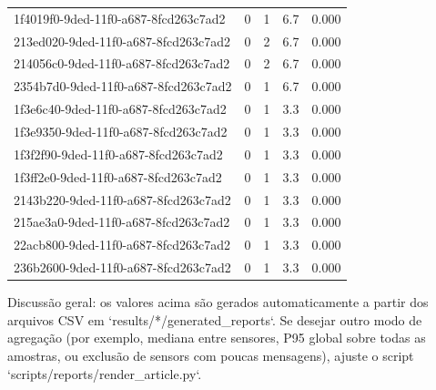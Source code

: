 \begin{longtable}{l r r r r}
1f4019f0-9ded-11f0-a687-8fcd263c7ad2 & 0 & 1 & 6.7 & 0.000 \\

213ed020-9ded-11f0-a687-8fcd263c7ad2 & 0 & 2 & 6.7 & 0.000 \\

214056c0-9ded-11f0-a687-8fcd263c7ad2 & 0 & 2 & 6.7 & 0.000 \\

2354b7d0-9ded-11f0-a687-8fcd263c7ad2 & 0 & 1 & 6.7 & 0.000 \\

1f3e6c40-9ded-11f0-a687-8fcd263c7ad2 & 0 & 1 & 3.3 & 0.000 \\

1f3e9350-9ded-11f0-a687-8fcd263c7ad2 & 0 & 1 & 3.3 & 0.000 \\

1f3f2f90-9ded-11f0-a687-8fcd263c7ad2 & 0 & 1 & 3.3 & 0.000 \\

1f3ff2e0-9ded-11f0-a687-8fcd263c7ad2 & 0 & 1 & 3.3 & 0.000 \\

2143b220-9ded-11f0-a687-8fcd263c7ad2 & 0 & 1 & 3.3 & 0.000 \\

215ae3a0-9ded-11f0-a687-8fcd263c7ad2 & 0 & 1 & 3.3 & 0.000 \\

22acb800-9ded-11f0-a687-8fcd263c7ad2 & 0 & 1 & 3.3 & 0.000 \\

236b2600-9ded-11f0-a687-8fcd263c7ad2 & 0 & 1 & 3.3 & 0.000 \\

\end{longtable}




Discussão geral: os valores acima são gerados automaticamente a partir dos arquivos CSV em `results/*/generated_reports`. Se desejar outro modo de agregação (por exemplo, mediana entre sensores, P95 global sobre todas as amostras, ou exclusão de sensors com poucas mensagens), ajuste o script `scripts/reports/render_article.py`.